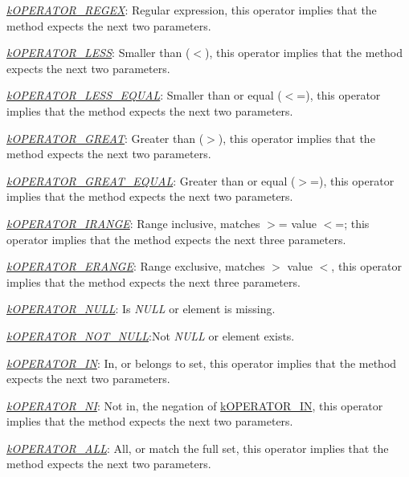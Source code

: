 \begin{DoxyItemize}
\begin{DoxyItemize}
\item {\itshape \hyperlink{}{k\-O\-P\-E\-R\-A\-T\-O\-R\-\_\-\-R\-E\-G\-E\-X}}\-: Regular expression, this operator implies that the method expects the next two parameters. 
\item {\itshape \hyperlink{}{k\-O\-P\-E\-R\-A\-T\-O\-R\-\_\-\-L\-E\-S\-S}}\-: Smaller than ($<$), this operator implies that the method expects the next two parameters. 
\item {\itshape \hyperlink{}{k\-O\-P\-E\-R\-A\-T\-O\-R\-\_\-\-L\-E\-S\-S\-\_\-\-E\-Q\-U\-A\-L}}\-: Smaller than or equal ($<$=), this operator implies that the method expects the next two parameters. 
\item {\itshape \hyperlink{}{k\-O\-P\-E\-R\-A\-T\-O\-R\-\_\-\-G\-R\-E\-A\-T}}\-: Greater than ($>$), this operator implies that the method expects the next two parameters. 
\item {\itshape \hyperlink{}{k\-O\-P\-E\-R\-A\-T\-O\-R\-\_\-\-G\-R\-E\-A\-T\-\_\-\-E\-Q\-U\-A\-L}}\-: Greater than or equal ($>$=), this operator implies that the method expects the next two parameters. 
\item {\itshape \hyperlink{}{k\-O\-P\-E\-R\-A\-T\-O\-R\-\_\-\-I\-R\-A\-N\-G\-E}}\-: Range inclusive, matches $>$= value $<$=; this operator implies that the method expects the next three parameters. 
\item {\itshape \hyperlink{}{k\-O\-P\-E\-R\-A\-T\-O\-R\-\_\-\-E\-R\-A\-N\-G\-E}}\-: Range exclusive, matches $>$ value $<$, this operator implies that the method expects the next three parameters. 
\item {\itshape \hyperlink{}{k\-O\-P\-E\-R\-A\-T\-O\-R\-\_\-\-N\-U\-L\-L}}\-: Is {\itshape N\-U\-L\-L} or element is missing. 
\item {\itshape \hyperlink{}{k\-O\-P\-E\-R\-A\-T\-O\-R\-\_\-\-N\-O\-T\-\_\-\-N\-U\-L\-L}}\-:Not {\itshape N\-U\-L\-L} or element exists. 
\item {\itshape \hyperlink{}{k\-O\-P\-E\-R\-A\-T\-O\-R\-\_\-\-I\-N}}\-: In, or belongs to set, this operator implies that the method expects the next two parameters. 
\item {\itshape \hyperlink{}{k\-O\-P\-E\-R\-A\-T\-O\-R\-\_\-\-N\-I}}\-: Not in, the negation of \hyperlink{}{k\-O\-P\-E\-R\-A\-T\-O\-R\-\_\-\-I\-N}, this operator implies that the method expects the next two parameters. 
\item {\itshape \hyperlink{}{k\-O\-P\-E\-R\-A\-T\-O\-R\-\_\-\-A\-L\-L}}\-: All, or match the full set, this operator implies that the method expects the next two parameters. 

\end{DoxyItemize}
\end{DoxyItemize}

